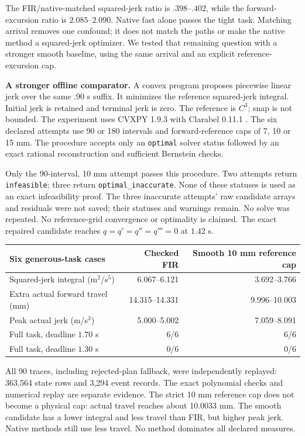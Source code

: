 \documentclass[10pt,letterpaper]{article}
\begin{document}
The FIR/native-matched squared-jerk ratio is $.398$--$.402$, while the
forward-excursion ratio is $2.085$--$2.090$. Native fast alone passes the tight
task. Matching arrival removes one confound; it does not match the paths or
make the native method a squared-jerk optimizer. We tested that remaining question with a stronger smooth baseline,
using the same arrival and an explicit reference-excursion cap.

\textbf{A stronger offline comparator.}
A convex program proposes piecewise linear jerk over the same $.90$ s suffix.
It minimizes the reference squared-jerk integral. Initial jerk is retained and
terminal jerk is zero. The reference is $C^3$; snap is not bounded.
The experiment uses CVXPY 1.9.3 with Clarabel 0.11.1
\cite{cvxpy,clarabel}. The six declared attempts use 90 or 180 intervals and forward-reference caps
of 7, 10 or 15 mm. The procedure accepts only an \texttt{optimal} solver status
followed by an exact rational reconstruction and sufficient Bernstein checks.

Only the 90-interval, 10 mm attempt passes this procedure. Two attempts return
\texttt{infeasible}; three return \texttt{optimal\_inaccurate}. None of these
statuses is used as an exact infeasibility proof. The three inaccurate attempts'
raw candidate arrays and residuals were not saved; their statuses and warnings
remain. No solve was repeated. No reference-grid convergence or optimality is
claimed. The exact repaired candidate reaches $q=q'=q''=q'''=0$ at $1.42$ s.

\begin{center}\small
\begin{tabular}{lrr}
\toprule
Six generous-task cases & Checked FIR & Smooth 10 mm reference cap\\
\midrule
Squared-jerk integral (m$^2$/s$^5$) & 6.067--6.121 & 3.692--3.766\\
Extra actual forward travel (mm) & 14.315--14.331 & 9.996--10.003\\
Peak actual jerk (m/s$^3$) & 5.000--5.002 & 7.059--8.091\\
Full task, deadline $1.70$ s & 6/6 & 6/6\\
Full task, deadline $1.30$ s & 0/6 & 0/6\\
\bottomrule
\end{tabular}
\end{center}
All 90 traces, including rejected-plan fallback, were independently replayed:
363,564 state rows and 3,294 event records. The exact polynomial checks and
numerical replay are separate evidence. The strict 10 mm reference cap does
not become a physical cap: actual travel reaches about 10.0033 mm.
The smooth candidate has a lower integral and less travel than FIR, but higher
peak jerk. Native methods still use less travel. No method dominates all
declared measures.
\end{document}
